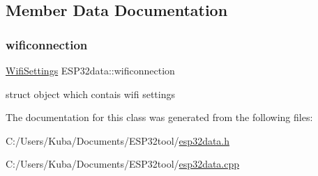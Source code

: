 \subsection{Member Data Documentation}
\mbox{\label{class_e_s_p32data_af22a2683c01fae73c97eb0e03884675b}} 
\subsubsection{\texorpdfstring{wificonnection}{wificonnection}}
{\footnotesize\ttfamily \hyperlink{struct_e_s_p32data_1_1_wifi_settings}{Wifi\+Settings} E\+S\+P32data\+::wificonnection}

struct object which contais wifi settings 

The documentation for this class was generated from the following files\+:\begin{DoxyCompactItemize}
\item 
C\+:/\+Users/\+Kuba/\+Documents/\+E\+S\+P32tool/\hyperlink{esp32data_8h}{esp32data.\+h}\item 
C\+:/\+Users/\+Kuba/\+Documents/\+E\+S\+P32tool/\hyperlink{esp32data_8cpp}{esp32data.\+cpp}\end{DoxyCompactItemize}
